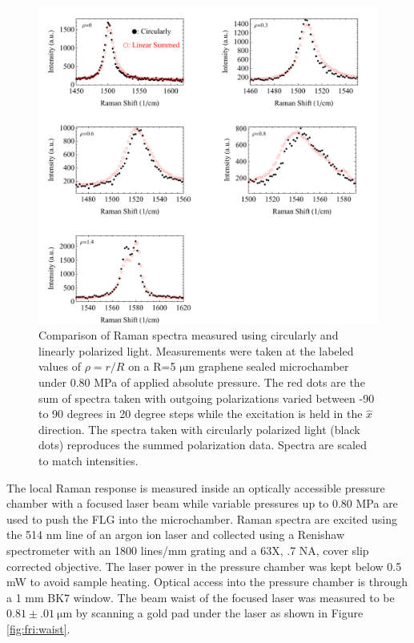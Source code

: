 \begin{figure}
	\begin{center}
	\includegraphics[scale=.75]{Figs_Friction/LinearvsCircular.pdf}
	\end{center}
	\caption[Comparison of Raman spectra measured using circularly and linearly polarized light]{\label{fig:fri:circlelinear}Comparison of Raman spectra measured using circularly and linearly polarized light.
	Measurements were taken at the labeled values of $\rho=r/R$ on a R=5 $\mathrm{\mu}$m graphene sealed microchamber under 0.80 MPa of applied absolute pressure.
	The red dots are the sum of spectra taken with outgoing polarizations varied between -90 to 90 degrees in 20 degree steps while the excitation is held in the $\hat x$ direction.
	The spectra taken with circularly polarized light (black dots) reproduces the summed polarization data.
	Spectra are scaled to match intensities.
	}
\end{figure}

The local Raman response is measured inside an optically accessible pressure chamber with a focused laser beam while variable pressures up to 0.80 MPa are used to push the FLG into the microchamber.
Raman spectra are excited using the 514 nm line of an argon ion laser and collected using a Renishaw spectrometer with an 1800 lines/mm grating and a 63X, .7 NA, cover slip corrected objective.
The laser power in the pressure chamber was kept below 0.5 mW to avoid sample heating.
Optical access into the pressure chamber is through a 1 mm BK7 window.
The beam waist of the focused laser was measured to be $0.81 \pm .01 \ \mathrm{\mu m}$ by scanning a gold pad under the laser as shown in Figure \ref{fig:fri:waist}.

